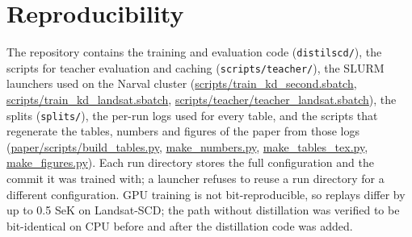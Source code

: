 \documentclass[journal,onecolumn,11pt]{IEEEtran}
\begin{document}
\section{Reproducibility}
The repository contains the training and evaluation code (\texttt{distilscd/}), the scripts for
teacher evaluation and caching (\texttt{scripts/teacher/}), the SLURM launchers used on the
Narval cluster (\url{scripts/train_kd_second.sbatch}, \url{scripts/train_kd_landsat.sbatch},
\url{scripts/teacher/teacher_landsat.sbatch}), the splits (\texttt{splits/}), the per-run logs
used for every table, and the scripts that regenerate the tables, numbers and figures of the paper
from those logs (\url{paper/scripts/build_tables.py}, \url{make_numbers.py},
\url{make_tables_tex.py}, \url{make_figures.py}). Each run directory stores the full
configuration and the commit it was trained with; a launcher refuses to reuse a run directory for
a different configuration. GPU training is not bit-reproducible, so replays differ by up to
0.5 SeK on Landsat-SCD; the path without distillation was verified to be bit-identical on CPU
before and after the distillation code was added.
\end{document}
